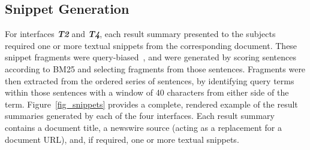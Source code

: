 %

\subsection{Snippet Generation}\label{sec:method:snippetgen}
For interfaces \textbf{\emph{T2}} and \textbf{\emph{T4}}, each result summary presented to the subjects required one or more textual snippets from the corresponding document. These snippet fragments were query-biased~\cite{tombros1998query_biased}, and were generated by scoring sentences according to BM25 and selecting fragments from those sentences. Fragments were then extracted from the ordered series of sentences, by identifying query terms within those sentences with a window of 40 characters from either side of the term. Figure~\ref{fig_snippets} provides a complete, rendered example of the result summaries generated by each of the four interfaces. Each result summary contains a document title, a newswire source (acting as a replacement for a document URL), and, if required, one or more textual snippets.

